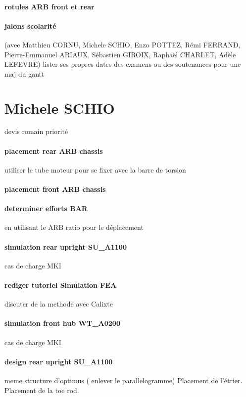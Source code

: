 \paragraph{rotules ARB front et rear} 
\paragraph{jalons scolarité} (avec Matthieu CORNU, Michele SCHIO, Enzo POTTEZ, Rémi FERRAND, Pierre-Emmanuel ARIAUX, Sébastien GIROIX, Raphaël CHARLET, Adèle LEFEVRE) lister ses propres dates des examens ou des soutenances pour une maj du gantt

 
 \newpage \section*{Michele SCHIO} 
 \par devis romain priorité
\paragraph{placement rear ARB chassis} utiliser le tube moteur pour se fixer avec la barre de torsion
\paragraph{placement front ARB chassis} 
\paragraph{determiner efforts BAR} en utilisant le ARB ratio pour le déplacement
\paragraph{simulation rear upright SU\_A1100} cas de charge MKI
\paragraph{rediger tutoriel Simulation FEA} discuter de la methode avec Calixte
\paragraph{simulation front hub WT\_A0200} cas de charge MKI

\paragraph{design rear upright SU\_A1100} meme structure d'optimus ( enlever le parallelogramme) Placement de l'étrier. Placement de la toe rod.

